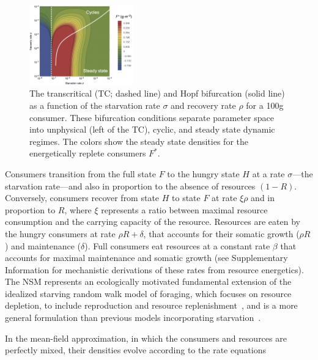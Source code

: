 \documentclass[twocolumn,preprintnumbers,amsmath,amssymb,superscriptaddress]{revtex4}
\begin{document}
\begin{bibunit}[unsrt]
\begin{figure}
\centering
\includegraphics[width=0.4\textwidth]{fig_FixedPoint2.eps}
\caption{\small{ The transcritical (TC; dashed line) and Hopf bifurcation (solid line) as a
  function of the starvation rate $\sigma$ and recovery rate $\rho$ for a 100g consumer.  These
  bifurcation conditions separate parameter space into unphysical (left of the TC), cyclic,
  and steady state dynamic regimes.  The colors show the steady state densities for the energetically replete consumers $F^*$.  
}\label{fig:fp}}
\end{figure}

Consumers transition from the full state $F$ to the hungry state $H$ at a rate $\sigma$---the starvation rate---and also in proportion to the absence of resources $(1-R)$.  Conversely, consumers recover from state $H$ to state $F$ at rate $\xi \rho$ and in proportion to $R$, where $\xi$ represents a ratio between maximal resource consumption and the carrying capacity of the resource. %
Resources are eaten by the hungry consumers at rate $\rho R + \delta$, that accounts for their somatic growth ($\rho R$) and  maintenance ($\delta$). Full consumers eat resources at a constant rate $\beta$ that accounts for maximal maintenance and somatic growth (see Supplementary Information for mechanistic derivations of these rates from resource energetics).
The NSM represents an ecologically motivated fundamental extension of the idealized starving random walk model of foraging, which focuses on resource depletion, to include reproduction and resource replenishment~\citep{Benichou:2014wu,Benichou:2016wl,Chupeau:2016jf}, and is a more general formulation than previous models incorporating starvation~\citep{Persson:1998hz}.

In the mean-field approximation, in which the consumers and resources are perfectly mixed, their densities evolve according to the rate equations


\end{bibunit}
\end{document}
